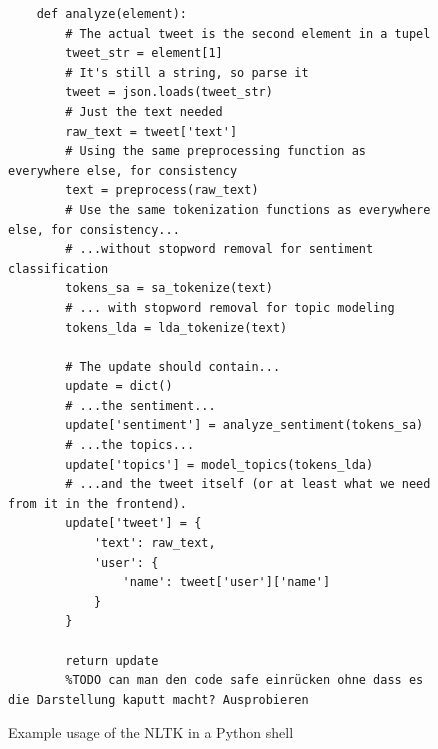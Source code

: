 \begin{figure}
    \caption{Example usage of the NLTK in a Python shell}
    \label{code:nltk}
    \begin{verbatim}
    def analyze(element):
        # The actual tweet is the second element in a tupel
        tweet_str = element[1]
        # It's still a string, so parse it
        tweet = json.loads(tweet_str)
        # Just the text needed
        raw_text = tweet['text']
        # Using the same preprocessing function as everywhere else, for consistency
        text = preprocess(raw_text)
        # Use the same tokenization functions as everywhere else, for consistency...
        # ...without stopword removal for sentiment classification
        tokens_sa = sa_tokenize(text)
        # ... with stopword removal for topic modeling
        tokens_lda = lda_tokenize(text)

        # The update should contain...
        update = dict()
        # ...the sentiment...
        update['sentiment'] = analyze_sentiment(tokens_sa)
        # ...the topics...
        update['topics'] = model_topics(tokens_lda)
        # ...and the tweet itself (or at least what we need from it in the frontend).
        update['tweet'] = {
            'text': raw_text,
            'user': {
                'name': tweet['user']['name']
            }
        }

        return update
        %TODO can man den code safe einrücken ohne dass es die Darstellung kaputt macht? Ausprobieren
    \end{verbatim}
\end{figure}

